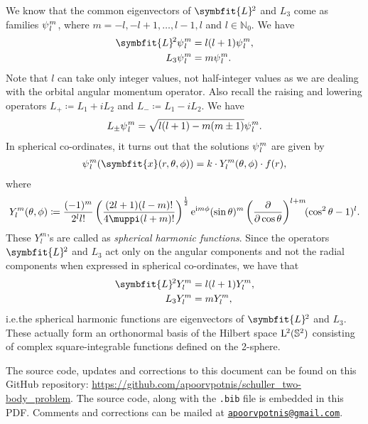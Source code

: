 \documentclass[12pt, a4 paper]{article}
\theoremstyle{definition}
\newcommand{\nn}{\mathbb{N}_0}
\renewcommand{\i}{\mathrm{i}}
\newcommand{\e}{\mathrm{e}}
\renewcommand{\pi}{\muppi}
\newcommand{\lvecsquare}{\symbfit{L}\kern-1pt^2}
\begin{document}
	We know that the common eigenvectors of $\lvecsquare$ and $L_3$ come as families $\psi\kern0.5pt_l^m$, where $m = -l, -l+1, \ldots, l-1, l$ and $l \in \nn$. We have
	\begin{align*}
	    \lvecsquare \psi\kern0.5pt_l^m &= l(l+1)\psi\kern0.5pt_l^m,\\
		L_3 \psi\kern0.5pt_l^m &= m \psi\kern0.5pt_l^m.
	\end{align*}
	Note that $l$ can take only integer values, not half-integer values as we are dealing with the orbital angular momentum operator. Also recall the raising and lowering operators $L_+ \coloneq L_1 + i L_2$ and $L_- \coloneq L_1 - iL_2$. We have
	\begin{align*}
		L_\pm \psi\kern0.5pt_l^m = \sqrt{l(l+1) - m(m\pm 1)} \psi\kern0.5pt_l^m.
	\end{align*}
	In spherical co-ordinates, it turns out that the solutions $\psi\kern0.5pt_l^m$ are given by
	\begin{align*}
		\psi\kern0.5pt_l^m (\symbfit{x} (r, \theta, \phi)) = k \cdot Y^m_l (\theta, \phi) \cdot f(r),
	\end{align*}
	where
	\begin{align*}
		Y^m_l (\theta, \phi) \coloneq \frac{(-1)^m}{2^l l!}\left(\frac{(2l+1) (l-m)!}{4\pi (l+m)!}\right)^{\frac{1}{2}}\e^{\i m\phi} (\sin{\theta})^m \left(\frac{\partial}{\partial \cos{\theta}}\right)^{l+m}\!\!(\cos^2{\theta} -1)^l.
	\end{align*}
	These $Y_l^m$'s are called as \textit{spherical harmonic functions}. Since the operators $\lvecsquare$ and $L_3$ act only on the angular components and not the radial components when expressed in spherical co-ordinates, we have that
	\begin{align*}
	    \lvecsquare Y_l^m &= l(l+1) Y_l^m,\\
		L_3 Y_l^m &= m Y_l^m,
	\end{align*}
	i.e.\@ the spherical harmonic functions are eigenvectors of $\lvecsquare$ and $L_3$. These actually form an orthonormal basis of the Hilbert space $\mathrm{L}\kern-0.7pt^2(\mathbb{S}^2)$ consisting of complex square-integrable functions defined on the 2-sphere.













%

	\nocite{*}
	\printbibliography[heading=bibintoc]

	\par\begin{spacing}{0.6}
		{\footnotesize The source code, updates and corrections to this document can be found on this GitHub repository: \url{https://github.com/apoorvpotnis/schuller_two-body_problem}. The source code, along with the \texttt{.bib} file is embedded in this PDF. Comments and corrections can be mailed at \href{mailto:apoorvpotnis@gmail.com}{\texttt{apoorvpotnis@gmail.com}}.}
	\end{spacing}
\end{document}
